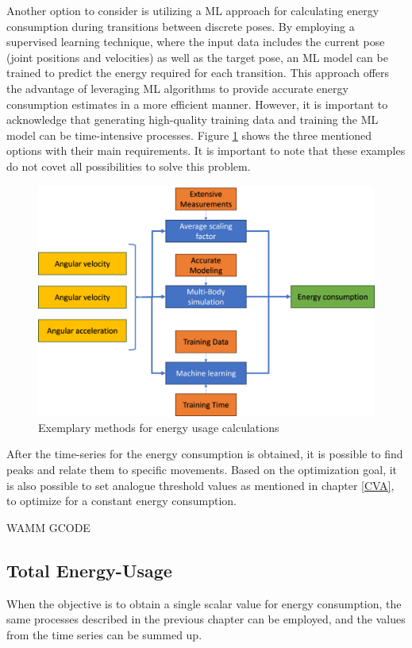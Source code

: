 Another option to consider is utilizing a ML approach for calculating energy consumption during transitions between discrete poses.  By employing a supervised learning technique, where the input data includes the current pose (joint positions and velocities) as well as the target pose, an ML model can be trained to predict the energy required for each transition. This approach offers the advantage of leveraging ML algorithms to provide accurate energy consumption estimates in a more efficient manner. However, it is important to acknowledge that generating high-quality training data and training the ML model can be time-intensive processes.
Figure \ref{ENERGYOPTIONS} shows the three mentioned options with their main requirements. It is important to note that these examples do not covet all possibilities to solve this problem.

\begin{figure}[H]
	\centerline{\includegraphics[width=.8\textwidth]{figures/ENERGYOPTIONS.png}}
	\caption{Exemplary methods for energy usage calculations}
	\label{ENERGYOPTIONS}
\end{figure}

After the time-series for the energy consumption is obtained, it is possible to find peaks and relate them to specific movements. Based on the optimization goal, it is also possible to set analogue threshold values as mentioned in chapter \ref{CVA}, to optimize for a constant energy consumption.


WAMM GCODE
 
\subsection{Total Energy-Usage}
When the objective is to obtain a single scalar value for energy consumption, the same processes described in the previous chapter can be employed, and the values from the time series can be summed up.

